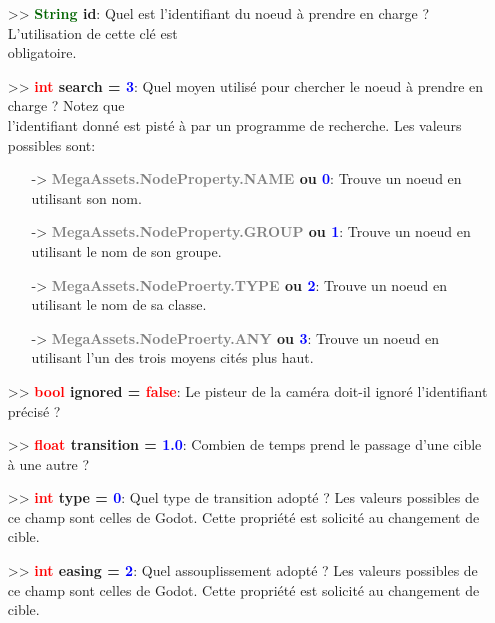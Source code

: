 \documentclass[a4paper, 11pt]{article}
\begin{document}
	\begin{itemize}
		\item[>> \textbf{\textcolor{darkgreen}{String} id}:] Quel est l'identifiant du noeud à prendre en 
		charge ? L'utilisation de cette clé est \\obligatoire.\\
		\item[>> \textbf{\textcolor{red}{int} search = \textcolor{blue}{3}}:] Quel moyen utilisé pour 
		chercher le noeud à prendre en charge ? Notez que \\l'identifiant donné est pisté à par un programme 
		de recherche. Les valeurs possibles sont:
		\begin{itemize}
			\item [-> \textbf{\textcolor{gray}{MegaAssets.NodeProperty.NAME} ou \textcolor{blue}{0}}:] 
			Trouve un noeud en utilisant son nom.
			\item [-> \textbf{\textcolor{gray}{MegaAssets.NodeProperty.GROUP} ou \textcolor{blue}{1}}:] 
			Trouve un noeud en utilisant le nom de son groupe.
			\item [-> \textbf{\textcolor{gray}{MegaAssets.NodeProerty.TYPE} ou \textcolor{blue}{2}}:] Trouve 
			un noeud en utilisant le nom de sa classe.
			\item [-> \textbf{\textcolor{gray}{MegaAssets.NodeProerty.ANY} ou \textcolor{blue}{3}}:] Trouve 
			un noeud en utilisant l'un des trois moyens cités plus haut.\\
		\end{itemize}
		\item[>> \textbf{\textcolor{red}{bool} ignored = \textcolor{red}{false}}:] Le pisteur de la caméra 
		doit-il ignoré l'identifiant précisé ?\\
		\item[>> \textbf{\textcolor{red}{float} transition = \textcolor{blue}{1.0}}:] Combien de temps prend 
		le passage d'une cible à une autre ?\\
		\item[>> \textbf{\textcolor{red}{int} type = \textcolor{blue}{0}}:] Quel type de transition adopté ?
		Les valeurs possibles de ce champ sont celles de Godot. Cette propriété est solicité au changement 
		de cible.\\
		\item[>> \textbf{\textcolor{red}{int} easing = \textcolor{blue}{2}}:] Quel assouplissement adopté ? 
		Les valeurs possibles de ce champ sont celles de Godot. Cette propriété est solicité au changement 
		de cible.\\

\end{itemize}
\end{document}
